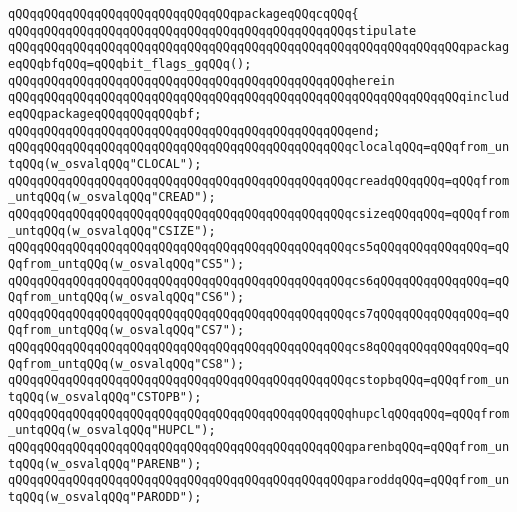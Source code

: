 \newline
\verb|qQQqqQQqqQQqqQQqqQQqqQQqqQQqqQQqpackageqQQqcqQQq{|\newline
\newline
\verb|qQQqqQQqqQQqqQQqqQQqqQQqqQQqqQQqqQQqqQQqqQQqqQQqstipulate|\newline
\verb|qQQqqQQqqQQqqQQqqQQqqQQqqQQqqQQqqQQqqQQqqQQqqQQqqQQqqQQqqQQqqQQqpackageqQQqbfqQQq=qQQqbit_flags_gqQQq();|\newline
\verb|qQQqqQQqqQQqqQQqqQQqqQQqqQQqqQQqqQQqqQQqqQQqqQQqherein|\newline
\verb|qQQqqQQqqQQqqQQqqQQqqQQqqQQqqQQqqQQqqQQqqQQqqQQqqQQqqQQqqQQqqQQqincludeqQQqpackageqQQqqQQqqQQqbf;|\newline
\verb|qQQqqQQqqQQqqQQqqQQqqQQqqQQqqQQqqQQqqQQqqQQqqQQqend;|\newline
\newline
\verb|qQQqqQQqqQQqqQQqqQQqqQQqqQQqqQQqqQQqqQQqqQQqqQQqclocalqQQq=qQQqfrom_untqQQq(w_osvalqQQq"CLOCAL");|\newline
\verb|qQQqqQQqqQQqqQQqqQQqqQQqqQQqqQQqqQQqqQQqqQQqqQQqcreadqQQqqQQq=qQQqfrom_untqQQq(w_osvalqQQq"CREAD");|\newline
\verb|qQQqqQQqqQQqqQQqqQQqqQQqqQQqqQQqqQQqqQQqqQQqqQQqcsizeqQQqqQQq=qQQqfrom_untqQQq(w_osvalqQQq"CSIZE");|\newline
\verb|qQQqqQQqqQQqqQQqqQQqqQQqqQQqqQQqqQQqqQQqqQQqqQQqcs5qQQqqQQqqQQqqQQq=qQQqfrom_untqQQq(w_osvalqQQq"CS5");|\newline
\verb|qQQqqQQqqQQqqQQqqQQqqQQqqQQqqQQqqQQqqQQqqQQqqQQqcs6qQQqqQQqqQQqqQQq=qQQqfrom_untqQQq(w_osvalqQQq"CS6");|\newline
\verb|qQQqqQQqqQQqqQQqqQQqqQQqqQQqqQQqqQQqqQQqqQQqqQQqcs7qQQqqQQqqQQqqQQq=qQQqfrom_untqQQq(w_osvalqQQq"CS7");|\newline
\verb|qQQqqQQqqQQqqQQqqQQqqQQqqQQqqQQqqQQqqQQqqQQqqQQqcs8qQQqqQQqqQQqqQQq=qQQqfrom_untqQQq(w_osvalqQQq"CS8");|\newline
\verb|qQQqqQQqqQQqqQQqqQQqqQQqqQQqqQQqqQQqqQQqqQQqqQQqcstopbqQQq=qQQqfrom_untqQQq(w_osvalqQQq"CSTOPB");|\newline
\verb|qQQqqQQqqQQqqQQqqQQqqQQqqQQqqQQqqQQqqQQqqQQqqQQqhupclqQQqqQQq=qQQqfrom_untqQQq(w_osvalqQQq"HUPCL");|\newline
\verb|qQQqqQQqqQQqqQQqqQQqqQQqqQQqqQQqqQQqqQQqqQQqqQQqparenbqQQq=qQQqfrom_untqQQq(w_osvalqQQq"PARENB");|\newline
\verb|qQQqqQQqqQQqqQQqqQQqqQQqqQQqqQQqqQQqqQQqqQQqqQQqparoddqQQq=qQQqfrom_untqQQq(w_osvalqQQq"PARODD");|\newline
